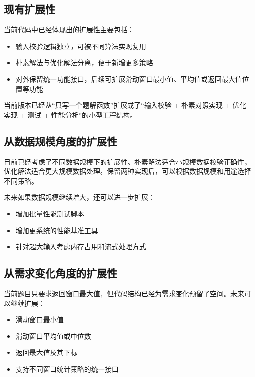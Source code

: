 \documentclass[a4paper,UTF8,fontset=none]{ctexart}
\begin{document}
\subsection{现有扩展性}

当前代码中已经体现出的扩展性主要包括：

\begin{itemize}
    \item 输入校验逻辑独立，可被不同算法实现复用
    \item 朴素解法与优化解法分离，便于新增更多策略
    \item 对外保留统一功能接口，后续可扩展滑动窗口最小值、平均值或返回最大值位置等功能
\end{itemize}

当前版本已经从“只写一个题解函数”扩展成了“输入校验 + 朴素对照实现 + 优化实现 + 测试 + 性能分析”的小型工程结构。

\subsection{从数据规模角度的扩展性}

目前已经考虑了不同数据规模下的扩展性。朴素解法适合小规模数据校验正确性，优化解法适合更大规模数据处理。保留两种实现后，可以根据数据规模和用途选择不同策略。

未来如果数据规模继续增大，还可以进一步扩展：

\begin{itemize}
    \item 增加批量性能测试脚本
    \item 增加更系统的性能基准工具
    \item 针对超大输入考虑内存占用和流式处理方式
\end{itemize}

\subsection{从需求变化角度的扩展性}

当前题目只要求返回窗口最大值，但代码结构已经为需求变化预留了空间。未来可以继续扩展：

\begin{itemize}
    \item 滑动窗口最小值
    \item 滑动窗口平均值或中位数
    \item 返回最大值及其下标
    \item 支持不同窗口统计策略的统一接口
\end{itemize}
\end{document}
